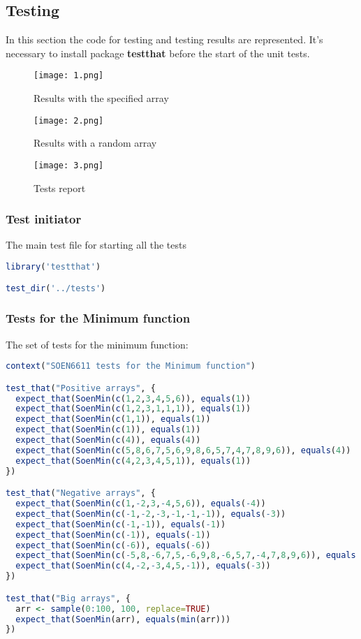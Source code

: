\documentclass[12pt]{article}
\begin{document}
\subsection{Testing}
In this section the code for testing and testing results are represented. It's necessary to install package \textbf{testthat} before the start of the unit tests.
\begin{figure}[h]
\centering
\texttt{[image: 1.png]}
\caption{Results with the specified array}
\end{figure}
\begin{figure}[h]
\centering
\texttt{[image: 2.png]}
\caption{Results with a random array}
\end{figure}
\newpage
\begin{figure}[h]
\centering
\texttt{[image: 3.png]}
\caption{Tests report}
\end{figure}
\subsubsection{Test initiator}
The main test file for starting all the tests
\begin{lstlisting}[language=R]
library('testthat')

test_dir('../tests')
\end{lstlisting}
\subsubsection{Tests for the Minimum function}
The set of tests for the minimum function:
\begin{lstlisting}[language=R]
context("SOEN6611 tests for the Minimum function")

test_that("Positive arrays", {
  expect_that(SoenMin(c(1,2,3,4,5,6)), equals(1))
  expect_that(SoenMin(c(1,2,3,1,1,1)), equals(1))
  expect_that(SoenMin(c(1,1)), equals(1))
  expect_that(SoenMin(c(1)), equals(1))
  expect_that(SoenMin(c(4)), equals(4))
  expect_that(SoenMin(c(5,8,6,7,5,6,9,8,6,5,7,4,7,8,9,6)), equals(4))
  expect_that(SoenMin(c(4,2,3,4,5,1)), equals(1))
})

test_that("Negative arrays", {
  expect_that(SoenMin(c(1,-2,3,-4,5,6)), equals(-4))
  expect_that(SoenMin(c(-1,-2,-3,-1,-1,-1)), equals(-3))
  expect_that(SoenMin(c(-1,-1)), equals(-1))
  expect_that(SoenMin(c(-1)), equals(-1))
  expect_that(SoenMin(c(-6)), equals(-6))
  expect_that(SoenMin(c(-5,8,-6,7,5,-6,9,8,-6,5,7,-4,7,8,9,6)), equals(-6))
  expect_that(SoenMin(c(4,-2,-3,4,5,-1)), equals(-3))
})

test_that("Big arrays", {
  arr <- sample(0:100, 100, replace=TRUE)
  expect_that(SoenMin(arr), equals(min(arr)))
})
\end{lstlisting}
\end{document}
